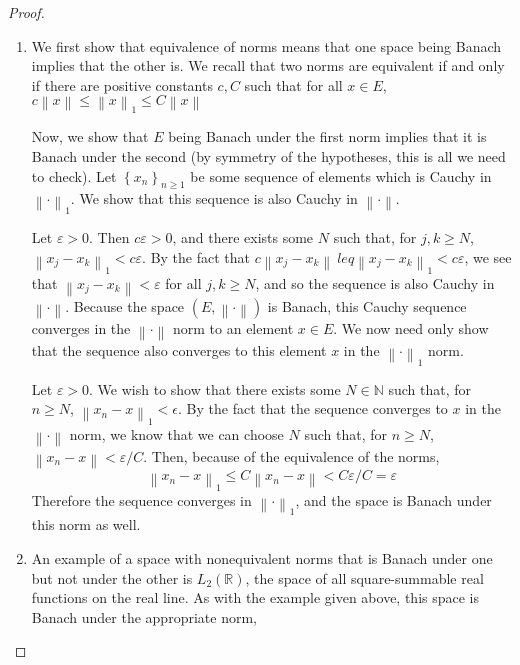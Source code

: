 \documentclass[12pt]{article}
\newcommand{\N}{\mathbb{N}}
\newcommand{\R}{\mathbb{R}}
\theoremstyle{definition}
\begin{document}
\begin{proof}
	\begin{enumerate}[label=(\roman*)]
		\item We first show that equivalence of norms means that one space being Banach implies that the other is. We recall that two norms are equivalent if and only if there are positive constants $c, C$ such that for all $x \in E$, $c \left \lVert { x } \right \lVert  \leq \left \lVert { x } \right \lVert _1 \leq C\left \lVert { x } \right \lVert $
			\par Now, we show that $E$ being Banach under the first norm implies that it is Banach under the second (by symmetry of the hypotheses, this is all we need to check). Let $\left\{ x_n \right\}_{n \geq 1}$ be some sequence of elements which is Cauchy in $\left \lVert { \cdot } \right \lVert _1$. We show that this sequence is also Cauchy in $\left \lVert { \cdot } \right \lVert $.
			\par Let $\varepsilon > 0$. Then $c\varepsilon > 0$, and there exists some $N$ such that, for $j, k \geq N$, $\left \lVert { x_j - x_k } \right \lVert_1 < c\varepsilon$. By the fact that $c\left \lVert { x_j - x_k } \right \lVert \ leq  \left \lVert { x_j - x_k } \right \lVert_1 < c \varepsilon$, we see that $\left \lVert { x_j - x_k } \right \lVert < \varepsilon$ for all $j, k \geq N$, and so the sequence is also Cauchy in $\left \lVert {  \cdot } \right \lVert $. Because the space $(E, \left \lVert { \cdot } \right \lVert )$ is Banach, this Cauchy sequence converges in the $\left \lVert {  \cdot } \right \lVert $ norm to an element $x \in E$. We now need only show that the sequence also converges to this element $x$ in the $\left \lVert { \cdot } \right \lVert_1$ norm.
			\par Let $\varepsilon > 0$. We wish to show that there exists some $N \in \N$ such that, for $n \geq N$, $\left \lVert { x_n - x } \right \lVert _1 < \epsilon$. By the fact that the sequence converges to $x$ in the $\left \lVert { \cdot } \right \lVert $ norm, we know that we can choose $N$ such that, for $n \geq N$, $\left \lVert { x_n - x } \right \lVert < \varepsilon/C$. Then, because of the equivalence of the norms,
			\[\left \lVert { x_n - x } \right \lVert _1 \leq C\left \lVert { x_n - x } \right \lVert < C\varepsilon/C = \varepsilon\]
			Therefore the sequence converges in $\left \lVert { \cdot } \right \lVert _1$, and the space is Banach under this norm as well. 
		\item An example of a space with nonequivalent norms that is Banach under one but not under the other is $L_2(\R)$, the space of all square-summable real functions on the real line. As with the example given above, this space is Banach under the appropriate norm, 

\end{enumerate}
\end{proof}
\end{document}
